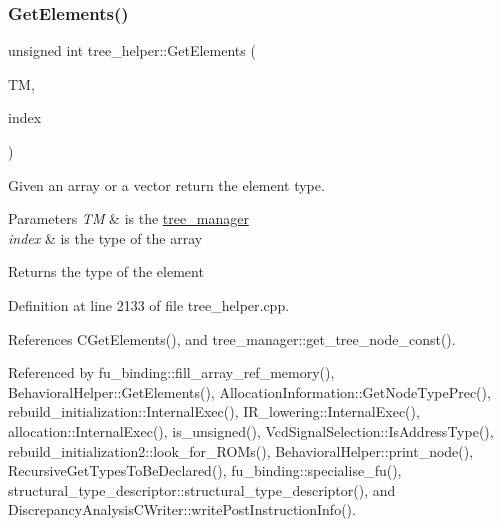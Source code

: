 \subsubsection{\texorpdfstring{Get\+Elements()}{GetElements()}}
{\footnotesize\ttfamily unsigned int tree\+\_\+helper\+::\+Get\+Elements (\begin{DoxyParamCaption}\item[{const \hyperlink{tree__manager_8hpp_a792e3f1f892d7d997a8d8a4a12e39346}{tree\+\_\+manager\+Const\+Ref}}]{TM,  }\item[{const unsigned int}]{index }\end{DoxyParamCaption})\hspace{0.3cm}{\ttfamily [static]}}



Given an array or a vector return the element type. 


\begin{DoxyParams}{Parameters}
{\em TM} & is the \hyperlink{classtree__manager}{tree\+\_\+manager} \\
\hline
{\em index} & is the type of the array \\
\hline
\end{DoxyParams}
\begin{DoxyReturn}{Returns}
the type of the element 
\end{DoxyReturn}


Definition at line 2133 of file tree\+\_\+helper.\+cpp.



References C\+Get\+Elements(), and tree\+\_\+manager\+::get\+\_\+tree\+\_\+node\+\_\+const().



Referenced by fu\+\_\+binding\+::fill\+\_\+array\+\_\+ref\+\_\+memory(), Behavioral\+Helper\+::\+Get\+Elements(), Allocation\+Information\+::\+Get\+Node\+Type\+Prec(), rebuild\+\_\+initialization\+::\+Internal\+Exec(), I\+R\+\_\+lowering\+::\+Internal\+Exec(), allocation\+::\+Internal\+Exec(), is\+\_\+unsigned(), Vcd\+Signal\+Selection\+::\+Is\+Address\+Type(), rebuild\+\_\+initialization2\+::look\+\_\+for\+\_\+\+R\+O\+Ms(), Behavioral\+Helper\+::print\+\_\+node(), Recursive\+Get\+Types\+To\+Be\+Declared(), fu\+\_\+binding\+::specialise\+\_\+fu(), structural\+\_\+type\+\_\+descriptor\+::structural\+\_\+type\+\_\+descriptor(), and Discrepancy\+Analysis\+C\+Writer\+::write\+Post\+Instruction\+Info().

